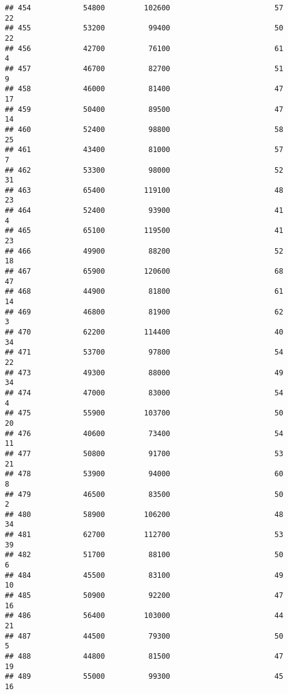 \documentclass[
]{article}
\begin{document}
\begin{verbatim}
## 454            54800         102600                        57           22
## 455            53200          99400                        50           22
## 456            42700          76100                        61            4
## 457            46700          82700                        51            9
## 458            46000          81400                        47           17
## 459            50400          89500                        47           14
## 460            52400          98800                        58           25
## 461            43400          81000                        57            7
## 462            53300          98000                        52           31
## 463            65400         119100                        48           23
## 464            52400          93900                        41            4
## 465            65100         119500                        41           23
## 466            49900          88200                        52           18
## 467            65900         120600                        68           47
## 468            44900          81800                        61           14
## 469            46800          81900                        62            3
## 470            62200         114400                        40           34
## 471            53700          97800                        54           22
## 473            49300          88000                        49           34
## 474            47000          83000                        54            4
## 475            55900         103700                        50           20
## 476            40600          73400                        54           11
## 477            50800          91700                        53           21
## 478            53900          94000                        60            8
## 479            46500          83500                        50            2
## 480            58900         106200                        48           34
## 481            62700         112700                        53           39
## 482            51700          88100                        50            6
## 484            45500          83100                        49           10
## 485            50900          92200                        47           16
## 486            56400         103000                        44           21
## 487            44500          79300                        50            5
## 488            44800          81500                        47           19
## 489            55000          99300                        45           16

\end{verbatim}
\end{document}
